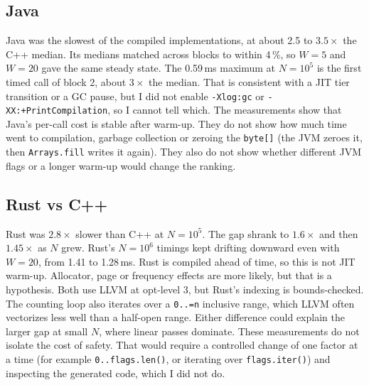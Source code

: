 \documentclass[11pt,a4paper]{article}
\newcommand{\code}[1]{\texttt{#1}}
\newcommand{\tenp}[1]{10^{#1}}
\begin{document}
\subsection*{Java}
Java was the slowest of the compiled implementations, at about 2.5 to $3.5\times$ the C++ median. Its
medians matched across blocks to within 4\,\%, so $W=5$ and $W=20$ gave the same steady state. The
0.59\,ms maximum at $N=\tenp{5}$ is the first timed call of block 2, about $3\times$ the median. That
is consistent with a JIT tier transition or a GC pause, but I did not enable \code{-Xlog:gc} or
\code{-XX:+PrintCompilation}, so I cannot tell which. The measurements show that Java's per-call cost
is stable after warm-up. They do not show how much time went to compilation, garbage collection or
zeroing the \code{byte[]} (the JVM zeroes it, then \code{Arrays.fill} writes it again). They also do
not show whether different JVM flags or a longer warm-up would change the ranking.

\subsection*{Rust vs C++}
Rust was $2.8\times$ slower than C++ at $N=\tenp{5}$. The gap shrank to $1.6\times$ and then
$1.45\times$ as $N$ grew. Rust's $N=\tenp{6}$ timings kept drifting downward even with $W=20$, from
1.41 to 1.28\,ms. Rust is compiled ahead of time, so this is not JIT warm-up. Allocator, page or
frequency effects are more likely, but that is a hypothesis. Both use LLVM at opt-level 3, but Rust's
indexing is bounds-checked. The counting loop also iterates over a \code{0..=n} inclusive range,
which LLVM often vectorizes less well than a half-open range. Either difference could explain the
larger gap at small $N$, where linear passes dominate. These measurements do not isolate the cost of
safety. That would require a controlled change of one factor at a time (for example
\code{0..flags.len()}, or iterating over \code{flags.iter()}) and inspecting the generated code,
which I did not do.
\end{document}
